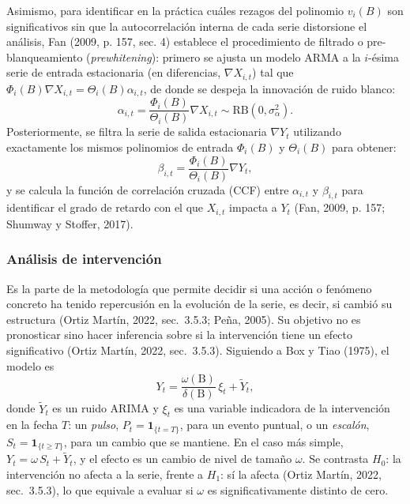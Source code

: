 \documentclass[11pt,letterpaper]{article}
\newcommand{\B}{\mathrm{B}}   %
\begin{document}
Asimismo, para identificar en la práctica cuáles rezagos del polinomio $v_i(B)$ son significativos sin que la autocorrelación interna de cada serie distorsione el análisis, Fan (2009, p. 157, sec. 4) establece el procedimiento de filtrado o pre-blanqueamiento (\textit{prewhitening}): primero se ajusta un modelo ARMA a la $i$-ésima serie de entrada estacionaria (en diferencias, $\nabla X_{i,t}$) tal que $\Phi_i(B)\nabla X_{i,t} = \Theta_i(B)\alpha_{i,t}$, de donde se despeja la innovación de ruido blanco:
\begin{equation}
\alpha_{i,t} = \frac{\Phi_i(B)}{\Theta_i(B)}\nabla X_{i,t} \sim \text{RB}(0, \sigma_\alpha^2).
\label{eq:fan_alfa}
\end{equation}
Posteriormente, se filtra la serie de salida estacionaria $\nabla Y_t$ utilizando exactamente los mismos polinomios de entrada $\Phi_i(B)$ y $\Theta_i(B)$ para obtener:
\begin{equation}
\beta_{i,t} = \frac{\Phi_i(B)}{\Theta_i(B)}\nabla Y_t ,
\label{eq:fan_beta}
\end{equation}
y se calcula la función de correlación cruzada (CCF) entre $\alpha_{i,t}$ y $\beta_{i,t}$ para identificar el grado de retardo con el que $X_{i,t}$ impacta a $Y_t$ (Fan, 2009, p. 157; Shumway y Stoffer, 2017).

\subsubsection{Análisis de intervención}
Es la parte de la metodología que permite decidir si una acción o fenómeno concreto ha tenido repercusión en la evolución de la serie, es decir, si cambió su estructura (Ortiz Martín, 2022, sec.~3.5.3; Peña, 2005). Su objetivo no es pronosticar sino hacer inferencia sobre si la intervención tiene un efecto significativo (Ortiz Martín, 2022, sec.~3.5.3). Siguiendo a Box y Tiao (1975), el modelo es
\[
Y_t=\frac{\omega(\B)}{\delta(\B)}\,\xi_t+\tilde{Y}_t ,
\]
donde $\tilde{Y}_t$ es un ruido ARIMA y $\xi_t$ es una variable indicadora de la intervención en la fecha $T$: un \emph{pulso}, $P_t=\mathbf{1}_{\{t=T\}}$, para un evento puntual, o un \emph{escalón}, $S_t=\mathbf{1}_{\{t\ge T\}}$, para un cambio que se mantiene. En el caso más simple, $Y_t=\omega\,S_t+\tilde{Y}_t$, y el efecto es un cambio de nivel de tamaño $\omega$. Se contrasta $H_0$: la intervención no afecta a la serie, frente a $H_1$: sí la afecta (Ortiz Martín, 2022, sec.~3.5.3), lo que equivale a evaluar si $\omega$ es significativamente distinto de cero.
\end{document}
